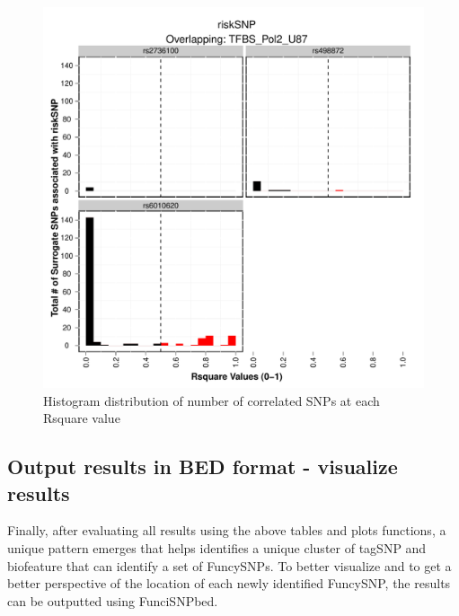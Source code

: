 \documentclass[a4paper]{article}
\begin{document}
\begin{figure}[ht!]
\begin{center}
\includegraphics{FunciSNP.0.1.7/plots/TFBS_Pol2_U87_R2summary_riskSNP.pdf}
\caption{\label{fig:TFBS_Pol2_U87_R2summary_riskSNP.pdf} Histogram 
distribution of number of correlated SNPs at each Rsquare value}
{\footnotesize{}}
\end{center}
\end{figure}

\newpage

\subsection*{Output results in BED format - visualize results}
Finally, after evaluating all results using the above tables and plots functions,
 a unique pattern emerges that helps identifies a unique cluster of tagSNP 
 and biofeature that can identify a set of FuncySNPs. To better visualize 
 and to get a better perspective of the location of each newly identified 
 FuncySNP, the results can be outputted using FunciSNPbed.
\end{document}
